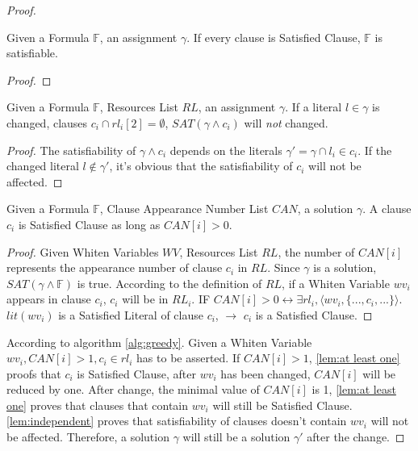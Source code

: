 \begin{proof}

\begin{lemma}[satisfiable]
\label{lem:satisfied}
Given a Formula $\mathbb{F}$, an assignment $\gamma$. If every clause is Satisfied Clause, $\mathbb{F}$ is satisfiable.
\end{lemma}
\begin{proof}
\end{proof}

\begin{lemma}[independent]
\label{lem:independent}
Given a Formula $\mathbb F$, Resources List $RL$, an assignment $\gamma$. If a literal $l \in \gamma$ is changed, clauses $c_i \cap rl_i[2] = \emptyset$, $SAT(\gamma \wedge c_i)$ will \emph{not} changed.
\end{lemma}
\begin{proof}
The satisfiability of $\gamma \wedge c_i$ depends on the literals $\gamma \prime = \gamma \cap l_i \in c_i$. If the changed literal $l \notin \gamma \prime$, it's obvious that the satisfiability of $c_i$ will not be affected.
\end{proof}

\begin{lemma}
\label{lem:at least one}
Given a Formula $\mathbb F$, Clause Appearance Number List $CAN$, a solution $\gamma$. A clause $c_i$ is Satisfied Clause as long as $CAN[i] > 0$.
\end{lemma}
\begin{proof}
Given Whiten Variables $WV$, Resources List $RL$, the number of $CAN[i]$ represents the appearance number of clause $c_i$ in $RL$. Since $\gamma$ is a solution, $SAT(\gamma \wedge \mathbb F)$ is true. According to the definition of $RL$, if a Whiten Variable $wv_i$ appears in clause $c_i$, $c_i$ will be in $RL_i$. IF $CAN[i] > 0 \leftrightarrow \exists rl_i, \langle wv_i, \{..., c_i, ...\}\rangle$. $lit(wv_i)$ is a Satisfied Literal of clause $c_i$, $\rightarrow$ $c_i$ is a Satisfied Clause.
\end{proof}

According to algorithm \ref{alg:greedy}. Given a Whiten Variable $wv_i, CAN[i] > 1,c_i \in rl_i$ has to be asserted. If $CAN[i] > 1$, \ref{lem:at least one} proofs that $c_i$ is Satisfied Clause, after $wv_i$ has been changed, $CAN[i]$ will be reduced by one. After change, the minimal value of $CAN[i]$ is 1, \ref{lem:at least one} proves that clauses that contain $wv_i$ will still be Satisfied Clause. \ref{lem:independent} proves that satisfiability of clauses doesn't contain $wv_i$ will not be affected. Therefore, a solution $\gamma$ will still be a solution $\gamma \prime$ after the change.
\end{proof}

